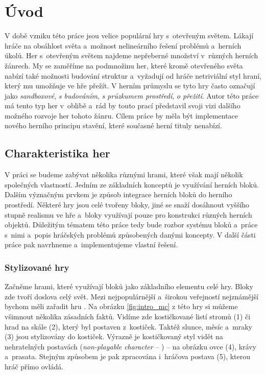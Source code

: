 
\chapter{Úvod}
\label{chap:uvod}

V době vzniku této práce jsou velice populární hry s~otevřeným světem. Lákají hráče na obsáhlost světa a~možnost nelineárního řešení problémů a~herních úkolů. Her s~otevřeným světem najdeme nepřeberné množství v~různých herních žánrech. My se zaměříme na podmnožinu her, které kromě otevřeného světa nabízí také možnosti budování struktur a~vyžadují od hráče netriviální styl hraní, který mu umožňuje ve hře přežít. V herním průmyslu se tyto hry často označují jako \textit{sandboxové}, \textit{s budováním}, \textit{s průzkumem prostředí}, \textit{o přežití}. Autor této práce má tento typ her v~oblibě a~rád by touto prací představil svoji vizi dalšího možného rozvoje her tohoto žánru. Cílem práce by měla být implementace nového herního principu stavění, které současné herní tituly nenabízí.

\section{Charakteristika her}
V práci se budeme zabývat několika různými hrami, které však mají několik společných vlastností. Jedním ze základních konceptů je využívání herních bloků. Dalším význačným prvkem je způsob integrace herních bloků do herního prostředí. Některé hry jsou celé tvořeny bloky, jiné se snaží dosáhnout vyššího stupně realismu ve hře a~bloky využívají pouze pro konstrukci různých herních objektů. Důležitým tématem této práce tedy bude rozbor systému bloků a~práce s~nimi a~popis hráčských problémů způsobených danými koncepty. V další části práce pak navrhneme a~implementujeme vlastní řešení.




\subsection{Stylizované hry}
Začněme hrami, které využívají bloků jako základního elementu celé hry. Bloky zde tvoří doslova celý svět. Mezi nejpopulárnější a~širokou veřejností nejznámější bychom měli zařadit hru \MC{}. Na obrázku \ref{fig:intro_mc} z této hry si můžeme všimnout několika zásadních faktů. Vidíme zde kostičkované listí stromů (1) či hrad na skále (2), který byl postaven z~kostiček. Taktéž slunce, měsíc a~mraky (3) jsou stylizovány do kostiček. Výrazně je kostičkovaný styl vidět na nehratelných postavách (\textit{non-playable character} -- \NPC{}) -- na obrázku ovce (4), krávy a~prasata. Stejným způsobem je pak zpracována i~hráčova postava (5), kterou hráč přímo ovládá.


